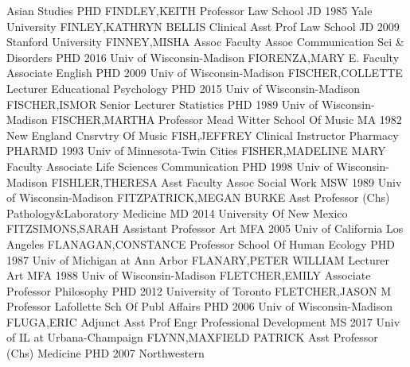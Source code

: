 \documentclass[
]{article}
\begin{document}
\textbar Asian Studies \textbar PHD \textbar{} 
\textbar FINDLEY,KEITH \textbar Professor \textbar Law School
\textbar JD 1985 Yale University \textbar{} 
\textbar FINLEY,KATHRYN BELLIS \textbar Clinical Asst Prof \textbar Law
School \textbar JD 2009 Stanford University \textbar{} 
\textbar FINNEY,MISHA \textbar Assoc Faculty Assoc
\textbar Communication Sci \& Disorders \textbar PHD 2016 Univ of
Wisconsin-Madison \textbar{}  \textbar FIORENZA,MARY E.
\textbar Faculty Associate \textbar English \textbar PHD 2009 Univ of
Wisconsin-Madison \textbar{}  \textbar FISCHER,COLLETTE
\textbar Lecturer \textbar Educational Psychology \textbar PHD 2015 Univ
of Wisconsin-Madison \textbar{}  \textbar FISCHER,ISMOR
\textbar Senior Lecturer \textbar Statistics \textbar PHD 1989 Univ of
Wisconsin-Madison \textbar{}  \textbar FISCHER,MARTHA
\textbar Professor \textbar Mead Witter School Of Music \textbar MA 1982
New England Cnsrvtry Of Music \textbar{} 
\textbar FISH,JEFFREY \textbar Clinical Instructor \textbar Pharmacy
\textbar PHARMD 1993 Univ of Minnesota-Twin Cities \textbar{}
 \textbar FISHER,MADELINE MARY \textbar Faculty Associate
\textbar Life Sciences Communication \textbar PHD 1998 Univ of
Wisconsin-Madison \textbar{}  \textbar FISHLER,THERESA
\textbar Asst Faculty Assoc \textbar Social Work \textbar MSW 1989 Univ
of Wisconsin-Madison \textbar{}  \textbar FITZPATRICK,MEGAN
BURKE \textbar Asst Professor (Chs) \textbar Pathology\&Laboratory
Medicine \textbar MD 2014 University Of New Mexico \textbar{}
 \textbar FITZSIMONS,SARAH \textbar Assistant Professor
\textbar Art \textbar MFA 2005 Univ of California Los Angeles \textbar{}
 \textbar FLANAGAN,CONSTANCE \textbar Professor
\textbar School Of Human Ecology \textbar PHD 1987 Univ of Michigan at
Ann Arbor \textbar{}  \textbar FLANARY,PETER WILLIAM
\textbar Lecturer \textbar Art \textbar MFA 1988 Univ of
Wisconsin-Madison \textbar{}  \textbar FLETCHER,EMILY
\textbar Associate Professor \textbar Philosophy \textbar PHD 2012
University of Toronto \textbar{}  \textbar FLETCHER,JASON M
\textbar Professor \textbar Lafollette Sch Of Publ Affairs \textbar PHD
2006 Univ of Wisconsin-Madison \textbar{} 
\textbar FLUGA,ERIC \textbar Adjunct Asst Prof \textbar Engr
Professional Development \textbar MS 2017 Univ of IL at Urbana-Champaign
\textbar{}  \textbar FLYNN,MAXFIELD PATRICK \textbar Asst
Professor (Chs) \textbar Medicine \textbar PHD 2007 Northwestern
\end{document}
